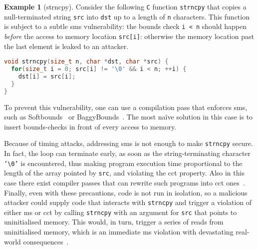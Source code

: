 \documentclass[dvipsnames,conference]{IEEEtran}
\theoremstyle{definition}
\newtheorem{exampleenv}{Example}[section]
\begin{document}
\begin{exampleenv}[strncpy]\label{ex:strncpy}
Consider the following \texttt{C} function \texttt{strncpy} that copies a null-terminated string \texttt{src} into \texttt{dst} up to a length of \texttt{n} characters.
This function is subject to a subtle \gls*{sms} vulnerability: the bounds check \texttt{i < n} should happen {\it before} the access to memory location \texttt{src[i]}: otherwise
the memory location past the last element is leaked to an attacker.
\begin{lstlisting}[language=c,basicstyle=\small\ttfamily,morekeywords={size_t}]
void strncpy(size_t n, char *dst, char *src) {
  for(size_t i = 0; src[i] != '\0' && i < n; ++i) {
    dst[i] = src[i];
  }
}
\end{lstlisting}
To prevent this vulnerability, one can use a compilation pass that enforces \gls*{sms}, such as Softbounds~\cite{nagarakatte2009soft} or BaggyBounds~\cite{akritidis2009baggy}.
The most na\"ive solution in this case is to insert bounds-checks in front of every access to memory.

Because of timing attacks, addressing \gls*{sms} is not enough to make \texttt{strncpy} secure.
In fact, the loop can terminate early, as soon as the string-terminating character \texttt{'\textbackslash 0'} is encountered, thus making program execution time proportional to the length of the array pointed by \texttt{src}, and violating the \gls*{cct} property.
Also in this case there exist compiler passes that can rewrite such programs into \gls*{cct} ones~\cite{cauligi2019fact}.
%
Finally, even with these precautions, code is not run in isolation, so a malicious attacker could supply code that interacts with \texttt{strncpy} and trigger a violation of either \gls*{ms} or \gls*{cct} by calling \texttt{strncpy} with an argument for \texttt{src} that points to uninitialised memory.
This would, in turn, trigger a series of reads from uninitialised memory, which is an immediate \gls*{ms} violation with devastating real-world consequences~\cite{uninit-0,uninit-1,uninit-2,uninit-3,uninit-4}.
\end{exampleenv}
\end{document}
